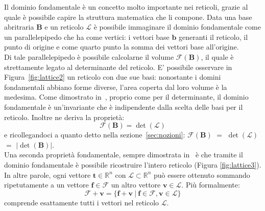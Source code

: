 Il dominio fondamentale è un concetto molto importante nei reticoli, grazie al quale è possibile
capire la struttura matematica che li compone. Data una base abritraria $\mathbf{B}$ e un reticolo 
$\mathcal{L}$ è possibile immaginare il dominio fondamentale come un parallelepipedo 
che ha come vertici: i vettori base $\mathbf{b}$ generanti il reticolo, il punto di origine e 
come quarto punto la somma dei vettori base all'origine. \\
Di tale parallelepipedo è possibile calcolarne il volume $\mathcal{F}(\mathbf{B})$, il 
quale è strettamente legato al determinante del reticolo. 
E' possibile osservare in Figura~\ref{fig:lattice2} un reticolo con due sue basi: nonostante 
i domini fondamentali abbiano forme diverse, l'area coperta dal loro volume è la medesima.
Come dimostrato in~\cite[Sezione 7.4]{HDMRD08}, proprio come per il
determinante, il dominio fondamentale è un'invariante che è indipendente dalla scelta 
delle basi per il reticolo. Inoltre ne deriva la proprietà:
\[
    \mathcal{F}(\mathbf{B}) = \det(\mathcal{L})
\]
e ricollegandoci a quanto detto nella sezione~\ref{sec:nozioni}: 
$\mathcal{F}(\mathbf{B})$ $=$ $\det(\mathcal{L})$ $=$ $|\det(\mathbf{B})|$.\\
Una seconda proprietà fondamentale, sempre dimostrata in~\cite{HDMRD08} è che tramite il
dominio fondamentale è possibile ricostruire l'intero reticolo (Figura \ref{fig:lattice3}). 
In altre parole, ogni vettore $\mathbf{t} \in \mathbb{R}^n$ con $\mathcal{L} \subset \mathbb{R}^n $ 
può essere ottenuto sommando ripetutamente a un vettore $\mathbf{f} \in \mathcal{F}$ un 
altro vettore $\mathbf{v} \in \mathcal{L}$.
Più formalmente: 
\[
    \mathcal{F} + \mathbf{v} = 
\{ 
    \mathbf{f} + \mathbf{v} \ | \ \mathbf{f} \in \mathcal{F}, \mathbf{v} \in \mathcal{L}
\} 
\]
comprende esattamente tutti i vettori nel reticolo $\mathcal{L}$.

